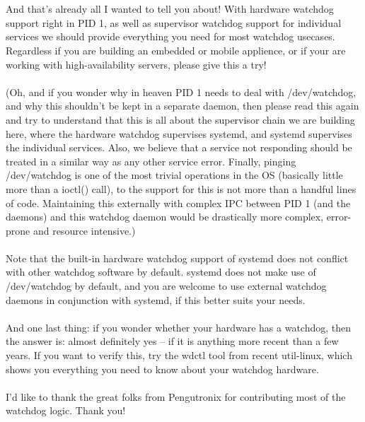 \documentclass[titlepage]{article}
\begin{document}
\\
\\
And that's already all I wanted to tell you about! With hardware watchdog support right in PID 1, as well as supervisor watchdog support for individual services we should provide everything you need for most watchdog usecases. Regardless if you are building an embedded or mobile applience, or if your are working with high-availability servers, please give this a try!
\\
\\
(Oh, and if you wonder why in heaven PID 1 needs to deal with /dev/watchdog, and why this shouldn't be kept in a separate daemon, then please read this again and try to understand that this is all about the supervisor chain we are building here, where the hardware watchdog supervises systemd, and systemd supervises the individual services. Also, we believe that a service not responding should be treated in a similar way as any other service error. Finally, pinging /dev/watchdog is one of the most trivial operations in the OS (basically little more than a ioctl() call), to the support for this is not more than a handful lines of code. Maintaining this externally with complex IPC between PID 1 (and the daemons) and this watchdog daemon would be drastically more complex, error-prone and resource intensive.)
\\
\\
Note that the built-in hardware watchdog support of systemd does not conflict with other watchdog software by default. systemd does not make use of /dev/watchdog by default, and you are welcome to use external watchdog daemons in conjunction with systemd, if this better suits your needs.
\\
\\
And one last thing: if you wonder whether your hardware has a watchdog, then the answer is: almost definitely yes -- if it is anything more recent than a few years. If you want to verify this, try the wdctl tool from recent util-linux, which shows you everything you need to know about your watchdog hardware.
\\
\\
I'd like to thank the great folks from Pengutronix for contributing most of the watchdog logic. Thank you!
\end{document}
